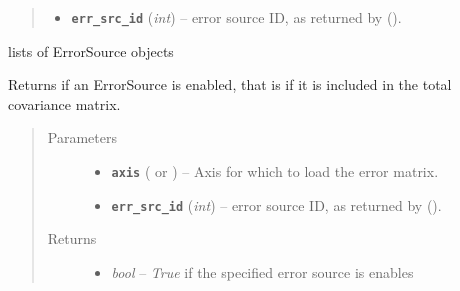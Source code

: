 \documentclass[a4paper,10pt,english]{sphinxmanual}
\begin{document}
\begin{fulllineitems}
\begin{fulllineitems}
\begin{quote}
\begin{description}
\begin{itemize}
\item {} 
\textbf{\texttt{err\_src\_id}} (\emph{int}) -- error source ID, as returned by
{\hyperref[index:kafe.dataset.Dataset.add_error_source]{\emph{}}} ().

\end{itemize}

\end{description}\end{quote}

\end{fulllineitems}


\begin{fulllineitems}
\label{index:kafe.dataset.Dataset.err_src}
lists of ErrorSource objects

\end{fulllineitems}


\begin{fulllineitems}
\label{index:kafe.dataset.Dataset.error_source_is_enabled}
Returns  if an ErrorSource is enabled, that is if it is included
in the total covariance matrix.
\begin{quote}\begin{description}
\item[{Parameters}] \leavevmode\begin{itemize}
\item {} 
\textbf{\texttt{axis}} ( or ) -- Axis for which to load the error matrix.

\item {} 
\textbf{\texttt{err\_src\_id}} (\emph{int}) -- error source ID, as returned by
{\hyperref[index:kafe.dataset.Dataset.add_error_source]{\emph{}}} ().

\end{itemize}

\item[{Returns}] \leavevmode
\begin{itemize}
\item {} 
\emph{bool} --
\emph{True} if the specified error source is enables


\end{itemize}
\end{description}
\end{quote}
\end{fulllineitems}
\end{fulllineitems}
\end{document}
